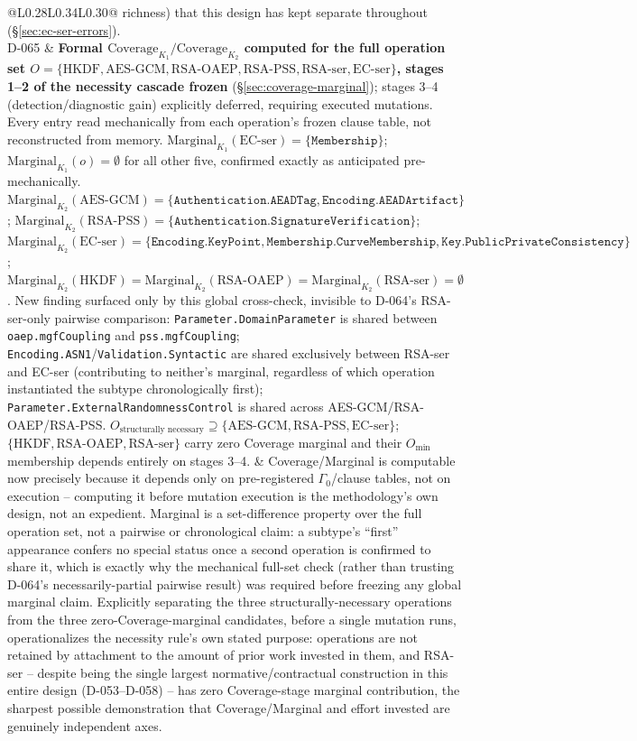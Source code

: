 \documentclass[11pt,a4paper]{article}
\begin{document}
\begin{longtable}{@{}L{0.28\textwidth}L{0.34\textwidth}L{0.30\textwidth}@{}}
richness) that this design has kept separate throughout (\S\ref{sec:ec-ser-errors}).\\
D-065 & \textbf{Formal $\text{Coverage}_{K_1}/\text{Coverage}_{K_2}$ computed for the full operation set $O=\{\text{HKDF},\text{AES-GCM},\text{RSA-OAEP},\text{RSA-PSS},\text{RSA-ser},\text{EC-ser}\}$, stages 1--2 of the necessity cascade frozen} (\S\ref{sec:coverage-marginal}); stages 3--4 (detection/diagnostic gain) explicitly deferred, requiring executed mutations. Every entry read mechanically from each operation's frozen clause table, not reconstructed from memory. $\text{Marginal}_{K_1}(\text{EC-ser})=\{\texttt{Membership}\}$; $\text{Marginal}_{K_1}(o)=\emptyset$ for all other five, confirmed exactly as anticipated pre-mechanically. $\text{Marginal}_{K_2}(\text{AES-GCM})=\{\texttt{Authentication.AEADTag},\texttt{Encoding.AEADArtifact}\}$; $\text{Marginal}_{K_2}(\text{RSA-PSS})=\{\texttt{Authentication.SignatureVerification}\}$; $\text{Marginal}_{K_2}(\text{EC-ser})=\{\texttt{Encoding.KeyPoint},\texttt{Membership.CurveMembership},\texttt{Key.PublicPrivateConsistency}\}$; $\text{Marginal}_{K_2}(\text{HKDF})=\text{Marginal}_{K_2}(\text{RSA-OAEP})=\text{Marginal}_{K_2}(\text{RSA-ser})=\emptyset$. New finding surfaced only by this global cross-check, invisible to D-064's RSA-ser-only pairwise comparison: \texttt{Parameter.DomainParameter} is shared between \texttt{oaep.mgfCoupling} and \texttt{pss.mgfCoupling}; \texttt{Encoding.ASN1}/\texttt{Validation.Syntactic} are shared exclusively between RSA-ser and EC-ser (contributing to neither's marginal, regardless of which operation instantiated the subtype chronologically first); \texttt{Parameter.ExternalRandomnessControl} is shared across AES-GCM/RSA-OAEP/RSA-PSS. $O_{\text{structurally necessary}}\supseteq\{\text{AES-GCM},\text{RSA-PSS},\text{EC-ser}\}$; $\{\text{HKDF},\text{RSA-OAEP},\text{RSA-ser}\}$ carry zero Coverage marginal and their $O_{\min}$ membership depends entirely on stages 3--4. & Coverage/Marginal is computable now precisely because it depends only on pre-registered $\Gamma_0$/clause tables, not on execution -- computing it before mutation execution is the methodology's own design, not an expedient. Marginal is a set-difference property over the full operation set, not a pairwise or chronological claim: a subtype's ``first'' appearance confers no special status once a second operation is confirmed to share it, which is exactly why the mechanical full-set check (rather than trusting D-064's necessarily-partial pairwise result) was required before freezing any global marginal claim. Explicitly separating the three structurally-necessary operations from the three zero-Coverage-marginal candidates, before a single mutation runs, operationalizes the necessity rule's own stated purpose: operations are not retained by attachment to the amount of prior work invested in them, and RSA-ser -- despite being the single largest normative/contractual construction in this entire design (D-053--D-058) -- has zero Coverage-stage marginal contribution, the sharpest possible demonstration that Coverage/Marginal and effort invested are genuinely independent axes.\\

\end{longtable}
\end{document}
